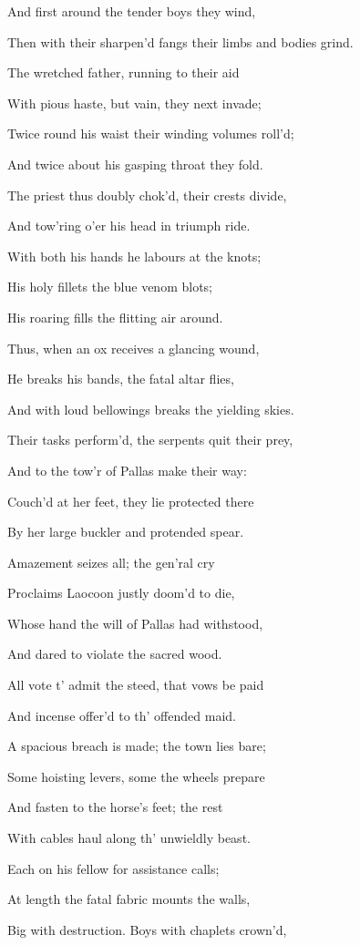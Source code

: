 And first around the tender boys they wind,

Then with their sharpen’d fangs their limbs and bodies grind.

The wretched father, running to their aid

With pious haste, but vain, they next invade;

Twice round his waist their winding volumes roll’d;

And twice about his gasping throat they fold.

The priest thus doubly chok’d, their crests divide,

And tow’ring o’er his head in triumph ride.

With both his hands he labours at the knots;

His holy fillets the blue venom blots;

His roaring fills the flitting air around.

Thus, when an ox receives a glancing wound,

He breaks his bands, the fatal altar flies,

And with loud bellowings breaks the yielding skies.

Their tasks perform’d, the serpents quit their prey,

And to the tow’r of Pallas make their way:

Couch’d at her feet, they lie protected there

By her large buckler and protended spear.

Amazement seizes all; the gen’ral cry

Proclaims Laocoon justly doom’d to die,

Whose hand the will of Pallas had withstood,

And dared to violate the sacred wood.

All vote t’ admit the steed, that vows be paid

And incense offer’d to th’ offended maid.

A spacious breach is made; the town lies bare;

Some hoisting levers, some the wheels prepare

And fasten to the horse’s feet; the rest

With cables haul along th’ unwieldly beast.

Each on his fellow for assistance calls;

At length the fatal fabric mounts the walls,

Big with destruction. Boys with chaplets crown’d,

